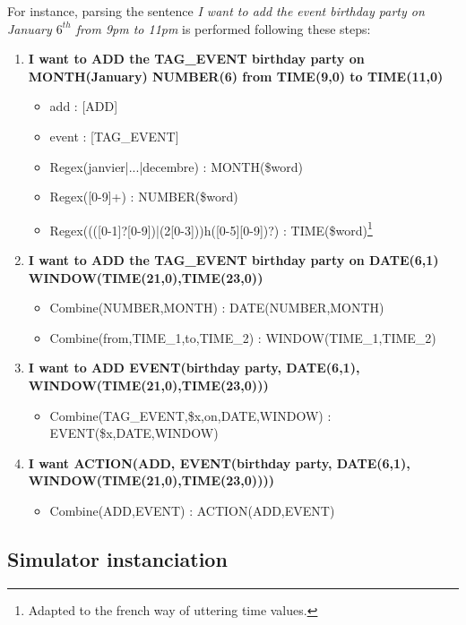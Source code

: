 			For instance, parsing the sentence \textit{I want to add the event birthday party on January $6^{th}$ from 9pm to 11pm} is performed following these steps:
							
							\begin{enumerate}
						\item \textbf{I want to ADD the TAG\_EVENT birthday party on MONTH(January) NUMBER(6) from TIME(9,0) to TIME(11,0)}
								\begin{itemize}
										\item add : [ADD]
											\item event : [TAG\_EVENT]
											\item Regex(janvier|...|decembre) : MONTH(\$word)
											\item Regex([0-9]+) : NUMBER(\$word)
											\item Regex((([0-1]?[0-9])|(2[0-3]))h([0-5][0-9])?) : TIME(\$word)\footnote{Adapted to the french way of uttering time values.}
									\end{itemize}
							\item \textbf{I want to ADD the TAG\_EVENT birthday party on DATE(6,1) \\ WINDOW(TIME(21,0),TIME(23,0))}
								\begin{itemize}
										\item Combine(NUMBER,MONTH) : DATE(NUMBER,MONTH)
											\item Combine(from,TIME\_1,to,TIME\_2) : WINDOW(TIME\_1,TIME\_2)
									\end{itemize}
							\item \textbf{I want to ADD EVENT(birthday party, DATE(6,1), \\ WINDOW(TIME(21,0),TIME(23,0)))}
								\begin{itemize}
										\item Combine(TAG\_EVENT,\$x,on,DATE,WINDOW) : EVENT(\$x,DATE,WINDOW)
									\end{itemize}
							\item \textbf{I want ACTION(ADD, EVENT(birthday party, DATE(6,1), \\ WINDOW(TIME(21,0),TIME(23,0))))}
								\begin{itemize}
										\item Combine(ADD,EVENT) : ACTION(ADD,EVENT)
									\end{itemize}
					\end{enumerate}
					
					
			\subsection{Simulator instanciation}
			
